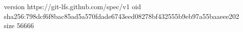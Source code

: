 version https://git-lfs.github.com/spec/v1
oid sha256:798dcf6f8bac85ad5a570fdade6743eed08278bf432555b9eb97a55baaeee202
size 56666
